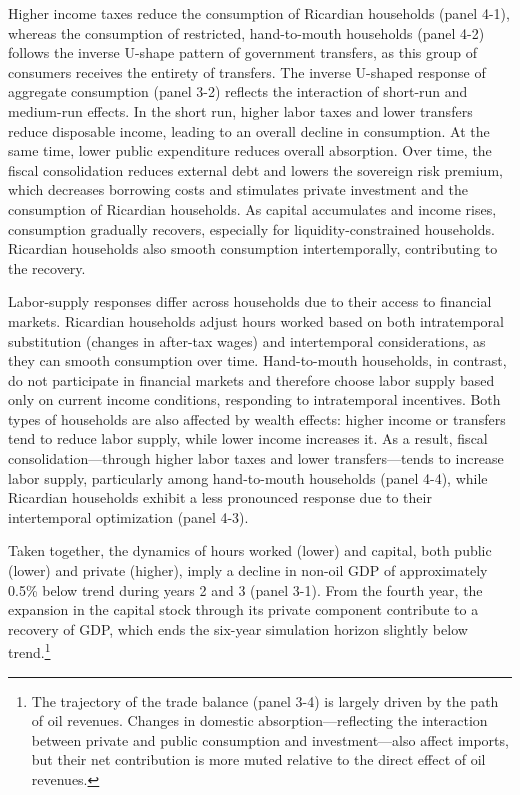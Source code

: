 \documentclass[12pt]{article}
\begin{document}
Higher income taxes reduce the consumption of Ricardian households (panel 4-1), whereas the consumption of restricted, hand-to-mouth households (panel 4-2) follows the inverse U-shape pattern of government transfers, as this group of consumers receives the entirety of transfers. The inverse U-shaped response of aggregate consumption (panel 3-2) reflects the interaction of short-run and medium-run effects. In the short run, higher labor taxes and lower transfers reduce disposable income, leading to an overall decline in consumption. At the same time, lower public expenditure reduces overall absorption. Over time, the fiscal consolidation reduces external debt and lowers the sovereign risk premium, which decreases borrowing costs and stimulates private investment and the consumption of Ricardian households. As capital accumulates and income rises, consumption gradually recovers, especially for liquidity-constrained households. Ricardian households also smooth consumption intertemporally, contributing to the recovery.

Labor-supply responses differ across households due to their access to financial markets. Ricardian households adjust hours worked based on both intratemporal substitution (changes in after-tax wages) and intertemporal considerations, as they can smooth consumption over time. Hand-to-mouth households, in contrast, do not participate in financial markets and therefore choose labor supply based only on current income conditions, responding to intratemporal incentives. Both types of households are also affected by wealth effects: higher income or transfers tend to reduce labor supply, while lower income increases it. As a result, fiscal consolidation—through higher labor taxes and lower transfers—tends to increase labor supply, particularly among hand-to-mouth households (panel 4-4), while Ricardian households exhibit a less pronounced response due to their intertemporal optimization (panel 4-3).

Taken together, the dynamics of hours worked (lower) and capital, both public (lower) and private (higher), imply a decline in non-oil GDP of approximately 0.5\% below trend during years 2 and 3 (panel 3-1). From the fourth year, the expansion in the capital stock through its private component contribute to a recovery of GDP, which ends the six-year simulation horizon slightly below trend.\footnote{The trajectory of the trade balance (panel 3-4) is largely driven by the path of oil revenues. Changes in domestic absorption—reflecting the interaction between private and public consumption and investment—also affect imports, but their net contribution is more muted relative to the direct effect of oil revenues.}
\end{document}
